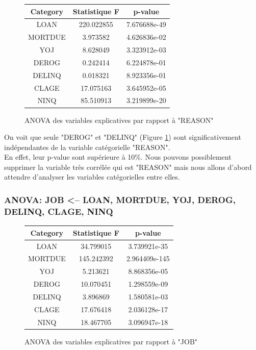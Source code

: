 \documentclass[a4paper,12pt]{report}
\begin{document}
\begin{figure}[h!]
  \begin{center}
    \begin{tabular}{||c c c||} 
     \hline
     Category & Statistique F & p-value \\ [0.5ex] 
     \hline\hline
     LOAN & 220.022855 & 7.676688e-49 \\ 
     \hline
     MORTDUE & 3.973582 & 4.626836e-02 \\
     \hline
     YOJ & 8.628049 & 3.323912e-03 \\
     \hline
     DEROG & 0.242414 & 6.224878e-01 \\
     \hline
     DELINQ & 0.018321 & 8.923356e-01 \\
     \hline
     CLAGE & 17.075163 & 3.645952e-05 \\
     \hline
     NINQ & 85.510913 & 3.219899e-20 \\ [1ex] 
     \hline
    \end{tabular}
  \end{center}
  \caption{ANOVA des variables explicatives par rapport à "REASON"}
  \label{fig:anova_reason_cat_on_nums}
\end{figure}

On voit que seule "DEROG" et "DELINQ" (Figure \ref{fig:anova_reason_cat_on_nums}) sont significativement indépendantes de la variable catégorielle "REASON".\\
En effet, leur p-value sont supérieure à 10\%. 
Nous pouvons possiblement supprimer la variable très corrélée qui est "REASON" mais nous allons d'abord attendre d'analyser les variables catégorielles entre elles.


\subsubsection{ANOVA: JOB <-- LOAN, MORTDUE, YOJ, DEROG, DELINQ, CLAGE, NINQ }

\begin{figure}[h!]
  \begin{center}
    \begin{tabular}{||c c c||} 
     \hline
     Category & Statistique F & p-value \\ [0.5ex] 
     \hline\hline
     LOAN & 34.799015 & 3.739921e-35 \\ 
     \hline
     MORTDUE & 145.242392 & 2.964409e-145 \\
     \hline
     YOJ & 5.213621 & 8.868356e-05 \\
     \hline
     DEROG & 10.070451 & 1.298559e-09 \\
     \hline
     DELINQ & 3.896869 & 1.580581e-03 \\
     \hline
     CLAGE & 17.676418 & 2.036128e-17 \\
     \hline
     NINQ & 18.467705 & 3.096947e-18 \\ [1ex] 
     \hline
    \end{tabular}
  \end{center}
  \caption{ANOVA des variables explicatives par rapport à "JOB"}
  \label{fig:anova_job_cat_on_nums}
\end{figure}
\end{document}
